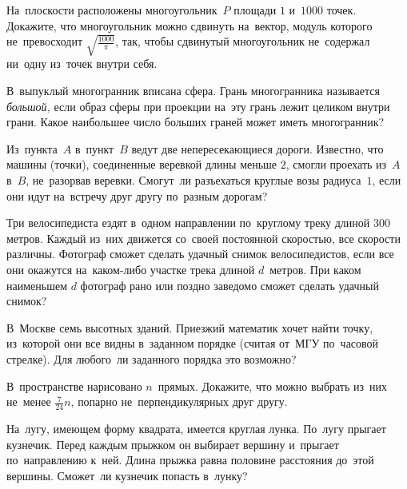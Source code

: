 


\begingroup
    \ifdefined\mathup \def\piconst{\mathup{\muppi}} \fi
    \ifdefined\uppi \providecommand\piconst{\uppi} \fi
    \providecommand\piconst{\pi}

\begin{problems}

\item
На~плоскости расположены многоугольник~$P$ площади $1$ и~$1000$ точек.
Докажите, что многоугольник можно сдвинуть на~вектор, модуль которого
не~превосходит $\sqrt{\frac{1000}{\pi}}$, так, чтобы сдвинутый многоугольник
не~содержал ни~одну из~точек внутри себя.

\item
В~выпуклый многогранник вписана сфера.
Грань многогранника называется \emph{большой,} если образ сферы при проекции
на~эту грань лежит целиком внутри грани.
Какое наибольшее число больших граней может иметь многогранник?

\item
Из~пункта~$A$ в~пункт~$B$ ведут две непересекающиеся дороги.
Известно, что машины (точки), соединенные веревкой длины меньше $2$, смогли
проехать из~$A$ в~$B$, не~разорвав веревки.
Смогут~ли разъехаться круглые возы радиуса~$1$, если они идут на~встречу друг
другу по~разным дорогам?

\item
Три велосипедиста ездят в~одном направлении по~круглому треку длиной
$300$ метров.
Каждый из~них движется со~своей постоянной скоростью, все скорости различны.
Фотограф сможет сделать удачный снимок велосипедистов, если все они окажутся
на~каком-либо участке трека длиной $d$~метров.
При каком наименьшем $d$ фотограф рано или поздно заведомо сможет сделать
удачный снимок?

\item
В~Москве семь высотных зданий.
Приезжий математик хочет найти точку, из~которой они все видны в~заданном
порядке (считая от~МГУ по~часовой стрелке).
Для любого~ли заданного порядка это возможно?

\item
В~пространстве нарисовано $n$~прямых.
Докажите, что можно выбрать из~них не~менее $\frac{7}{24}n$, попарно
не~перпендикулярных друг другу.

\item
На~лугу, имеющем форму квадрата, имеется круглая лунка.
По~лугу прыгает кузнечик.
Перед каждым прыжком он выбирает вершину и~прыгает по~направлению к~ней.
Длина прыжка равна половине расстояния до~этой вершины.
Сможет~ли кузнечик попасть в~лунку?


\end{problems}
